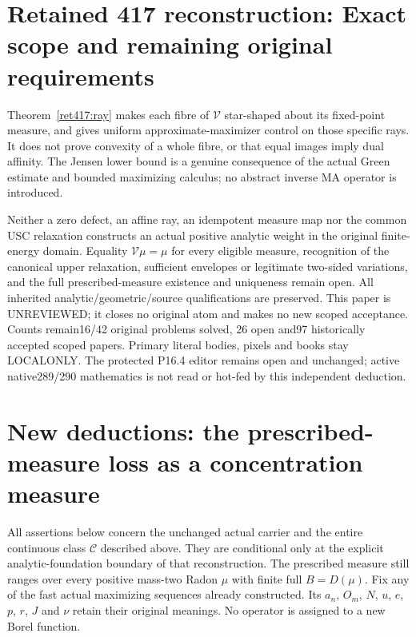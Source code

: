 \documentclass[11pt]{article}
\newcommand{\C}{\mathcal C}
\newcommand{\V}{\mathcal V}
\begin{document}
\section{Retained 417 reconstruction: Exact scope and remaining original requirements}
Theorem~\ref{ret417:ray} makes each fibre of $\V$ star-shaped about its
fixed-point measure, and gives uniform approximate-maximizer control
on those specific rays. It does not prove convexity of a whole fibre,
or that equal images imply dual affinity. The Jensen lower bound is
a genuine consequence of the actual Green estimate and bounded
maximizing calculus; no abstract inverse MA operator is introduced.

Neither a zero defect, an affine ray, an idempotent measure map nor
the common USC relaxation constructs an actual positive analytic
weight in the original finite-energy domain. Equality $\V\mu=\mu$
for every eligible measure, recognition of the canonical upper
relaxation, sufficient envelopes or legitimate two-sided variations,
and the full prescribed-measure existence and uniqueness remain open.
All inherited analytic/geometric/source qualifications are preserved.
This paper is UNREVIEWED; it closes no original atom and makes no
new scoped acceptance. Counts remain16/42 original problems solved,
26 open and97 historically accepted scoped papers. Primary literal
bodies, pixels and books stay LOCALONLY. The protected P16.4 editor
remains open and unchanged; active native289/290 mathematics is not
read or hot-fed by this independent deduction.

\endgroup

\section{New deductions: the prescribed-measure loss as a concentration measure}
All assertions below concern the unchanged actual carrier and the entire
continuous class $\C$ described above. They are conditional only at the
explicit analytic-foundation boundary of that reconstruction. The prescribed
measure still ranges over every positive mass-two Radon $\mu$ with finite
full $B=D(\mu)$. Fix any of the fast actual maximizing sequences already
constructed. Its $a_n$, $O_m$, $N$, $u$, $e$, $p$, $r$, $J$ and $\nu$ retain
their original meanings. No operator is assigned to a new Borel function.
\end{document}

